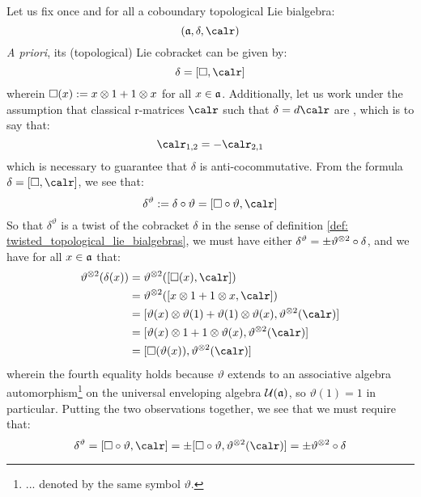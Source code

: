         Let us fix once and for all a coboundary topological Lie bialgebra:
            $$(\a, \delta, \calr)$$
        \textit{A priori}, its (topological) Lie cobracket can be given by:
            $$\delta = [ \Box, \calr ]$$
        wherein $\Box(x) := x \tensor 1 + 1 \tensor x$ for all $x \in \mathfrak{a}$. Additionally, let us work under the assumption that classical r-matrices $\calr$ such that $\delta = d\calr$ are , which is to say that:
            $$\calr_{1, 2} = -\calr_{2, 1}$$
        which is necessary to guarantee that $\delta$ is anti-cocommutative. From the formula $\delta = [ \Box, \calr ]$, we see that:
            \begin{equation}
                \delta^{\vartheta} := \delta \circ \vartheta = [ \Box \circ \vartheta, \calr ]
            \end{equation}
        So that $\delta^{\vartheta}$ is a twist of the cobracket $\delta$ in the sense of definition \ref{def: twisted_topological_lie_bialgebras}, we must have either $\delta^{\vartheta} = \pm \vartheta^{\tensor 2} \circ \delta$, and we have for all $x \in \mathfrak{a}$ that:
            $$
                \begin{aligned}
                    \vartheta^{\tensor 2}(\delta(x)) & = \vartheta^{\tensor 2}([\Box(x), \calr])
                    \\
                    & = \vartheta^{\tensor 2}( [x \tensor 1 + 1 \tensor x, \calr] )
                    \\
                    & = [ \vartheta(x) \tensor \vartheta(1) + \vartheta(1) \tensor \vartheta(x), \vartheta^{\tensor 2}(\calr) ]
                    \\
                    & = [ \vartheta(x) \tensor 1 + 1 \tensor \vartheta(x), \vartheta^{\tensor 2}(\calr) ]
                    \\
                    & = [ \Box(\vartheta(x)), \vartheta^{\tensor 2}(\calr) ]
                \end{aligned}
            $$
        wherein the fourth equality holds because $\vartheta$ extends to an associative algebra automorphism\footnote{... denoted by the same symbol $\vartheta$.} on the universal enveloping algebra $\mathcal{U}(\mathfrak{a})$, so $\vartheta(1) = 1$ in particular. Putting the two observations together, we see that we must require that:
            \begin{equation}
                \delta^{\vartheta} = [\Box \circ \vartheta, \calr] = \pm [ \Box \circ \vartheta, \vartheta^{\tensor 2}(\calr) ] = \pm \vartheta^{\tensor 2} \circ \delta
            \end{equation}
